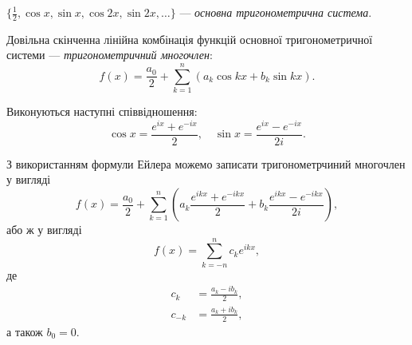 \begin{definition}
    $\{\frac{1}{2}, \cos x, \sin x, \cos 2x, \sin 2x, \ldots\}$ --- \textit{основна тригонометрична система}.
\end{definition}

\begin{definition}
    Довільна скінченна лінійна комбінація функцій основної тригонометричної системи --- \textit{тригонометричний многочлен}:
    \begin{equation}
        f(x) = \frac{a_0}{2} + \sum_{k = 1}^n (a_k \cos k x + b_k \sin k x).
    \end{equation}
\end{definition}

\begin{th_formula}[Ейлера]
    Виконуються наступні співвідношення:
    \begin{equation}
        \cos x = \frac{e^{ix} + e^{-ix}}{2}, \quad \sin x = \frac{e^{ix} - e^{-ix}}{2 i}.
    \end{equation}
\end{th_formula}

З використанням формули Ейлера можемо записати тригонометрчиний многочлен у вигляді
\begin{equation}
    f(x) = \frac{a_0}{2} + \sum_{k = 1}^n \left( a_k \frac{e^{ikx} + e^{-ikx}}{2} + b_k \frac{e^{ikx} - e^{-ikx}}{2 i} \right),
\end{equation}
або ж у вигляді
\begin{equation}
    \label{eq:1.1.9}
    f(x) = \sum_{k = -n}^n c_k e^{ikx},
\end{equation}
де
\begin{align}
    \label{eq:1.1.10}
    c_k &= \frac{a_k - i b_k}{2}, \\
    \label{eq:1.1.11}
    c_{-k} &= \frac{a_k + i b_k}{2},
\end{align}
а також $b_0 = 0$.

